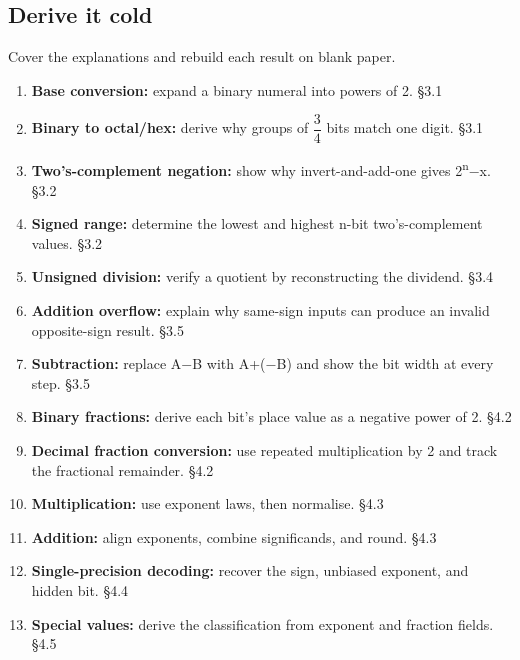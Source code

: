 \documentclass[11pt]{article}
\begin{document}
\begin{keepsection}
\section{Derive it cold}

Cover the explanations and rebuild each result on blank paper.

\begin{enumerate}
\item \textbf{Base conversion:} expand a binary numeral into powers of 2. \hfill{\small\color{FAUblue}§3.1}
\item \textbf{Binary to octal/hex:} derive why groups of {\small\ensuremath{\dfrac{3}{4}}} bits match one digit. \hfill{\small\color{FAUblue}§3.1}
\item \textbf{Two’s-complement negation:} show why invert-and-add-one gives 2\textsuperscript{n}\ensuremath{-}x. \hfill{\small\color{FAUblue}§3.2}
\item \textbf{Signed range:} determine the lowest and highest n-bit two’s-complement values. \hfill{\small\color{FAUblue}§3.2}
\item \textbf{Unsigned division:} verify a quotient by reconstructing the dividend. \hfill{\small\color{FAUblue}§3.4}
\item \textbf{Addition overflow:} explain why same-sign inputs can produce an invalid opposite-sign result. \hfill{\small\color{FAUblue}§3.5}
\item \textbf{Subtraction:} replace A\ensuremath{-}B with A+(\ensuremath{-}B) and show the bit width at every step. \hfill{\small\color{FAUblue}§3.5}
\item \textbf{Binary fractions:} derive each bit’s place value as a negative power of 2. \hfill{\small\color{FAUblue}§4.2}
\item \textbf{Decimal fraction conversion:} use repeated multiplication by 2 and track the fractional remainder. \hfill{\small\color{FAUblue}§4.2}
\item \textbf{Multiplication:} use exponent laws, then normalise. \hfill{\small\color{FAUblue}§4.3}
\item \textbf{Addition:} align exponents, combine significands, and round. \hfill{\small\color{FAUblue}§4.3}
\item \textbf{Single-precision decoding:} recover the sign, unbiased exponent, and hidden bit. \hfill{\small\color{FAUblue}§4.4}
\item \textbf{Special values:} derive the classification from exponent and fraction fields. \hfill{\small\color{FAUblue}§4.5}

\end{enumerate}
\end{keepsection}
\end{document}

